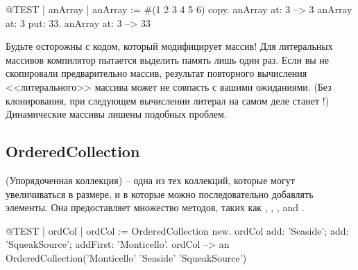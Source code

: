 \documentclass[a4paper,10pt,twoside]{book}
\begin{document}
\begin{code}{@TEST | anArray |}
anArray := #(1 2 3 4 5 6) copy.
anArray at: 3 --> 3
anArray at: 3 put: 33.
anArray at: 3 --> 33
\end{code}

\noindent
Будьте осторожны с кодом, который модифицирует массив!
Для литеральных массивов компилятор пытается выделить память лишь один раз.
Если вы не скопировали предварительно массив, результат повторного вычисления <<литерального>> массива может не совпасть с вашими ожиданиями.
(Без клонирования, при следующем вычислении литерал  на самом деле станет !)
Динамические массивы лишены подобных проблем.

\subsection{OrderedCollection}
 (Упорядоченная коллекция) -- одна из тех коллекций, которые могут увеличиваться в размере, и в которые можно последовательно добавлять элементы. Она предоставляет множество методов, таких как , , , and . 

\begin{code}{@TEST | ordCol |}
ordCol := OrderedCollection new.
ordCol add: 'Seaside'; add: 'SqueakSource'; addFirst: 'Monticello'.
ordCol --> an OrderedCollection('Monticello' 'Seaside' 'SqueakSource')
\end{code}
\end{document}
